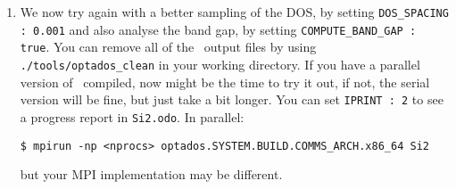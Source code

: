 \documentclass[a4paper,11pt,twoside]{book}
\begin{document}
{\begin{enumerate}
This file can be plotted by your favourite graph-plotting software. However, \optados\ has made things easy and generated a  {\tt Si2.adaptive.agr} file which is directly plottable using \verb#xmgrace# as shown in Fig.\,\ref{fig:Si2_adaptive1}.

\verb#$ xmgrace Si2.adaptive.agr#.

\begin{figure}[h]
\begin{center}
\caption{Density of States of Silicon generated by adaptive broadening and a very coarse energy sampling of 0.1 eV.}
\label{fig:Si2_adaptive1}
\end{center}
\end{figure}

\item We now try again with a better sampling of the DOS, by setting \verb#DOS_SPACING : 0.001# and also analyse the band gap, by setting \verb#COMPUTE_BAND_GAP : true#.  You can remove all of the \optados\ output files by using \verb#./tools/optados_clean# in your working directory.  If you have a parallel version of \optados\ compiled, now might be the time to try it out, if not, the serial version will be fine, but just take a bit longer.  You can set \verb#IPRINT : 2# to see a progress report in  \verb#Si2.odo#.  In parallel:

\verb#$ mpirun -np <nprocs> optados.SYSTEM.BUILD.COMMS_ARCH.x86_64 Si2#

but your MPI implementation may be different.


\end{enumerate}}
\end{document}
